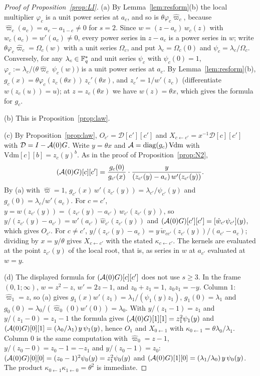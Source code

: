 \begin{proof}[Proof of Proposition~\ref{prop:LI}]
(a) By Lemma~\ref{lem:resform}(b) the local multiplier $\varphi_c$ is a unit power series at $a_c$, and so is $\theta\varphi_c\hat\varpi_c$, because $\hat\varpi_c(a_c)=a_c-a_{1-c}\ne0$ for $s=2$. Since $w=(z-a_c)\,w_c(z)$ with $w_c(a_c)=w'(a_c)\ne0$, every power series in $z-a_c$ is a power series in $w$; write $\theta\varphi_c\hat\varpi_c=\Omega_c(w)$ with a unit series $\Omega_c$, and put $\lambda_c=\Omega_c(0)$ and $\psi_c=\lambda_c/\Omega_c$. Conversely, for any $\lambda_c\in\mathbb{F}_q^*$ and unit series $\psi_c$ with $\psi_c(0)=1$, $\varphi_c:=\lambda_c/\bigl(\theta\hat\varpi_c\,\psi_c(w)\bigr)$ is a unit power series at $a_c$. By Lemma~\ref{lem:resform}(b), $g_c(x)=\theta\varphi_c(z_c(\theta x))\,z_c'(\theta x)$, and $z_c'=1/w'(z_c)$ (differentiate $w(z_c(u))=u$); at $z=z_c(\theta x)$ we have $w(z)=\theta x$, which gives the formula for $g_c$.

(b) This is Proposition~\ref{prop:law}.

(c) By Proposition~\ref{prop:law}, $O_{c'}=\mathcal D[c'][c']$ and $X_{c\leftarrow c'}=x^{-1}\mathcal D[c][c']$ with $\mathcal D=I-\mathcal{A}(0)G$. Write $y=\theta x$ and $\mathcal{A}=\operatorname{diag}(g_c)\,\mathrm{Vdm}$ with $\mathrm{Vdm}[c][b]=z_c(y)^b$. As in the proof of Proposition~\ref{prop:N2},
\[
(\mathcal{A}(0)G)[c][c']=\frac{g_c(0)}{g_{c'}(x)}\cdot\frac{y}{(z_{c'}(y)-a_c)\,w'(z_{c'}(y))} .
\]
By (a) with $\hat\varpi=1$, $g_{c'}(x)\,w'(z_{c'}(y))=\lambda_{c'}/\psi_{c'}(y)$ and $g_c(0)=\lambda_c/w'(a_c)$. For $c=c'$, $y=w(z_{c'}(y))=(z_{c'}(y)-a_{c'})\,w_{c'}(z_{c'}(y))$, so $y/(z_{c'}(y)-a_{c'})=w'(a_{c'})\,\hat w_{c'}(z_{c'}(y))$ and $(\mathcal{A}(0)G)[c'][c']=[\hat w_{c'}\psi_{c'}](y)$, which gives $O_{c'}$. For $c\ne c'$, $y/(z_{c'}(y)-a_c)=y\,\check w_{cc'}(z_{c'}(y))/(a_{c'}-a_c)$; dividing by $x=y/\theta$ gives $X_{c\leftarrow c'}$ with the stated $\kappa_{c\leftarrow c'}$. The kernels are evaluated at the point $z_{c'}(y)$ of the local root, that is, as series in $w$ at $a_{c'}$ evaluated at $w=y$.

(d) The displayed formula for $(\mathcal{A}(0)G)[c][c']$ does not use $s\ge3$. In the frame $(0,1;\infty)$, $w=z^2-z$, $w'=2z-1$, and $z_0+z_1=1$, $z_0z_1=-y$. Column $1$: $\hat\varpi_1=z$, so (a) gives $g_1(x)w'(z_1)=\lambda_1/(\psi_1(y)z_1)$, $g_1(0)=\lambda_1$ and $g_0(0)=\lambda_0/(\hat\varpi_0(0)w'(0))=\lambda_0$. With $y/(z_1-1)=z_1$ and $y/(z_1-0)=z_1-1$ the formula gives $(\mathcal{A}(0)G)[1][1]=z_1^2\psi_1(y)$ and $(\mathcal{A}(0)G)[0][1]=(\lambda_0/\lambda_1)\,y\,\psi_1(y)$, hence $O_1$ and $X_{0\leftarrow1}$ with $\kappa_{0\leftarrow1}=\theta\lambda_0/\lambda_1$. Column $0$ is the same computation with $\hat\varpi_0=z-1$, $y/(z_0-0)=z_0-1=-z_1$ and $y/(z_0-1)=z_0$: $(\mathcal{A}(0)G)[0][0]=(z_0-1)^2\psi_0(y)=z_1^2\psi_0(y)$ and $(\mathcal{A}(0)G)[1][0]=(\lambda_1/\lambda_0)\,y\,\psi_0(y)$. The product $\kappa_{0\leftarrow1}\kappa_{1\leftarrow0}=\theta^2$ is immediate.
\end{proof}

